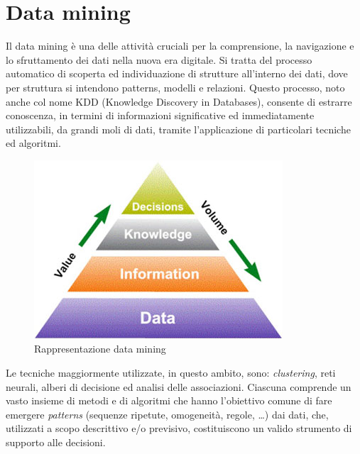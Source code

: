 
\chapter{Data mining}
Il data mining è una delle attività cruciali per la
comprensione, la navigazione e lo sfruttamento dei dati
nella nuova era digitale. Si tratta del
processo automatico di scoperta ed individuazione di
strutture all'interno dei dati, dove per struttura si
intendono patterns, modelli e relazioni. Questo
processo, noto anche col nome KDD (Knowledge
Discovery in Databases), consente di estrarre
conoscenza, in termini di informazioni significative ed
immediatamente utilizzabili, da grandi moli di dati,
tramite l'applicazione di particolari tecniche ed
algoritmi. 

\begin{figure}[h]
\centering
\includegraphics[width=0.7\linewidth]{immagini/datamining}
\caption[Modello del data mining]{Rappresentazione data mining}
\label{fig:datamining}
\end{figure}

Le tecniche maggiormente utilizzate, in questo ambito,
sono: \textit{clustering}, reti neurali, alberi di decisione ed
analisi delle associazioni. Ciascuna comprende un
vasto insieme di metodi e di algoritmi che hanno
l'obiettivo comune di fare emergere \textit{patterns} (sequenze
ripetute, omogeneità, regole, …) dai dati, che, utilizzati
a scopo descrittivo e/o previsivo, costituiscono un
valido strumento di supporto alle decisioni. 






